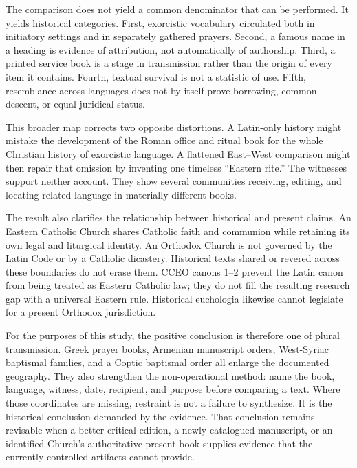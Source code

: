 The comparison does not yield a common denominator that can be performed. It
yields historical categories. First, exorcistic vocabulary circulated both in
initiatory settings and in separately gathered prayers. Second, a famous name
in a heading is evidence of attribution, not automatically of authorship.
Third, a printed service book is a stage in transmission rather than the origin
of every item it contains. Fourth, textual survival is not a statistic of use.
Fifth, resemblance across languages does not by itself prove borrowing, common
descent, or equal juridical status.

This broader map corrects two opposite distortions. A Latin-only history might
mistake the development of the Roman office and ritual book for the whole
Christian history of exorcistic language. A flattened East--West comparison
might then repair that omission by inventing one timeless ``Eastern rite.''
The witnesses support neither account. They show several communities receiving,
editing, and locating related language in materially different books.

The result also clarifies the relationship between historical and present
claims. An Eastern Catholic Church shares Catholic faith and communion while
retaining its own legal and liturgical identity. An Orthodox Church is not
governed by the Latin Code or by a Catholic dicastery. Historical texts shared
or revered across these boundaries do not erase them. CCEO canons 1--2 prevent
the Latin canon from being treated as Eastern Catholic law; they do not fill
the resulting research gap with a universal Eastern rule. Historical
euchologia likewise cannot legislate for a present Orthodox jurisdiction.

For the purposes of this study, the positive conclusion is therefore one of
plural transmission. Greek prayer books, Armenian manuscript orders,
West-Syriac baptismal families, and a Coptic baptismal order all enlarge the
documented geography. They also strengthen the non-operational method: name the
book, language, witness, date, recipient, and purpose before comparing a text.
Where those coordinates are missing, restraint is not a failure to synthesize.
It is the historical conclusion demanded by the evidence.
That conclusion remains revisable when a better critical edition, a newly
catalogued manuscript, or an identified Church's authoritative present book
supplies evidence that the currently controlled artifacts cannot provide.
